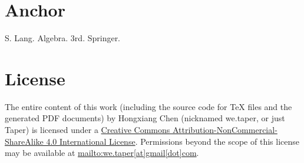 \documentclass{article}
\begin{document}
\section{Anchor}
\printnomenclature
\begin{thebibliography}{1}
     S. Lang. Algebra. 3rd. Springer.
\end{thebibliography}
\section{License}
The entire content of this work (including the source code
for TeX files and the generated PDF documents) by 
Hongxiang Chen (nicknamed we.taper, or just Taper) is
licensed under a 
\href{http://creativecommons.org/licenses/by-nc-sa/4.0/}{Creative 
Commons Attribution-NonCommercial-ShareAlike 4.0 International 
License}. Permissions beyond the scope of this 
license may be available at \url{mailto:we.taper[at]gmail[dot]com}.
\end{document}
